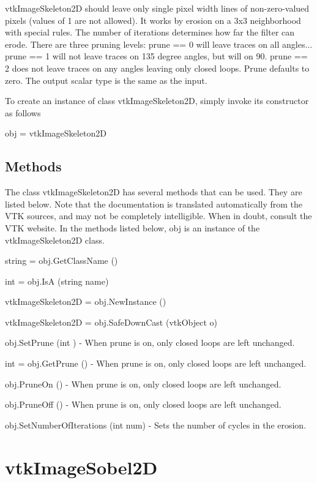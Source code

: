 vtk\-Image\-Skeleton2\-D should leave only single pixel width lines of non-\/zero-\/valued pixels (values of 1 are not allowed). It works by erosion on a 3x3 neighborhood with special rules. The number of iterations determines how far the filter can erode. There are three pruning levels\-: prune == 0 will leave traces on all angles... prune == 1 will not leave traces on 135 degree angles, but will on 90. prune == 2 does not leave traces on any angles leaving only closed loops. Prune defaults to zero. The output scalar type is the same as the input.

To create an instance of class vtk\-Image\-Skeleton2\-D, simply invoke its constructor as follows \begin{DoxyVerb}  obj = vtkImageSkeleton2D
\end{DoxyVerb}
 \hypertarget{vtkwidgets_vtkxyplotwidget_Methods}{}\subsection{Methods}\label{vtkwidgets_vtkxyplotwidget_Methods}
The class vtk\-Image\-Skeleton2\-D has several methods that can be used. They are listed below. Note that the documentation is translated automatically from the V\-T\-K sources, and may not be completely intelligible. When in doubt, consult the V\-T\-K website. In the methods listed below, {\ttfamily obj} is an instance of the vtk\-Image\-Skeleton2\-D class. 
\begin{DoxyItemize}
\item {\ttfamily string = obj.\-Get\-Class\-Name ()}  
\item {\ttfamily int = obj.\-Is\-A (string name)}  
\item {\ttfamily vtk\-Image\-Skeleton2\-D = obj.\-New\-Instance ()}  
\item {\ttfamily vtk\-Image\-Skeleton2\-D = obj.\-Safe\-Down\-Cast (vtk\-Object o)}  
\item {\ttfamily obj.\-Set\-Prune (int )} -\/ When prune is on, only closed loops are left unchanged.  
\item {\ttfamily int = obj.\-Get\-Prune ()} -\/ When prune is on, only closed loops are left unchanged.  
\item {\ttfamily obj.\-Prune\-On ()} -\/ When prune is on, only closed loops are left unchanged.  
\item {\ttfamily obj.\-Prune\-Off ()} -\/ When prune is on, only closed loops are left unchanged.  
\item {\ttfamily obj.\-Set\-Number\-Of\-Iterations (int num)} -\/ Sets the number of cycles in the erosion.  
\end{DoxyItemize}\hypertarget{vtkimaging_vtkimagesobel2d}{}\section{vtk\-Image\-Sobel2\-D}\label{vtkimaging_vtkimagesobel2d}
